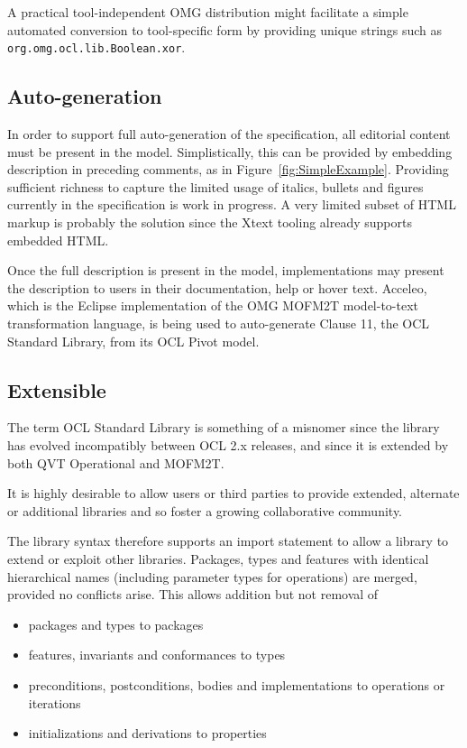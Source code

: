 \documentclass{eceasst}
\begin{document}
A practical tool-independent OMG distribution might facilitate a simple automated conversion to tool-specific form by providing unique strings such as \verb|org.omg.ocl.lib.Boolean.xor|.

\subsection{Auto-generation}

In order to support full auto-generation of the specification, all editorial content must be present in the model. Simplistically, this can be provided by embedding description in preceding comments, as in Figure~\ref{fig:SimpleExample}. Providing sufficient richness to capture the limited usage of italics, bullets and figures currently in the specification is work in progress. A very limited subset of HTML markup is probably the solution since the Xtext tooling already supports embedded HTML.

Once the full description is present in the model, implementations may present the description to users in their documentation, help or hover text. Acceleo\cite{M2T/Acceleo}, which is the Eclipse implementation of the OMG MOFM2T\cite{MOFM2T} model-to-text transformation language, is being used to auto-generate Clause 11, the OCL Standard Library, from its OCL Pivot model.

\subsection{Extensible}

The term OCL Standard Library is something of a misnomer since the library has evolved incompatibly between OCL 2.x releases, and since it is extended by both QVT Operational and MOFM2T.

It is highly desirable to allow users or third parties to provide extended, alternate or additional libraries and so foster a growing collaborative community.

The library syntax therefore supports an import statement to allow a library to extend or exploit other libraries. Packages, types and features with identical hierarchical names (including parameter types for operations) are merged, provided no conflicts arise. This allows addition but not removal of

\begin{itemize}
\item packages and types to packages
\item features, invariants and conformances to types
\item preconditions, postconditions, bodies and implementations to operations or iterations
\item initializations and derivations to properties
\end{itemize}
\end{document}
